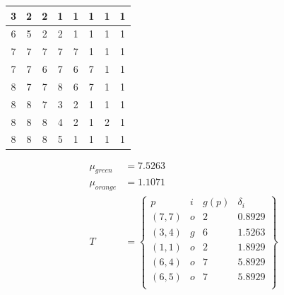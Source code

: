 \documentclass[fleqn]{article}
\begin{document}
\begin{description}
    \begin{tabular}{| c | c | c | c | c | c | c | c |}
        \hline
        \cellcolor{brown} 3 & \cellcolor{orange} 2 & \cellcolor{orange} 2 & \cellcolor{orange} 1 & \cellcolor{orange} 1 & \cellcolor{orange} 1 & \cellcolor{orange} 1 & \cellcolor{orange} 1 \\ \hline
        \cellcolor{gray} 6 & \cellcolor{gray} 5 & \cellcolor{gray} 2 & \cellcolor{gray} 2 & \cellcolor{orange} 1 & \cellcolor{orange} 1 & \cellcolor{orange} 1 & \cellcolor{orange} 1 \\ \hline
        \cellcolor{green} 7 & \cellcolor{green} 7 & \cellcolor{green} 7 & \cellcolor{gray} 7 & \cellcolor{gray} 7 & \cellcolor{orange} 1 & \cellcolor{orange} 1 & \cellcolor{orange} 1 \\ \hline
        \cellcolor{green} 7 & \cellcolor{green} 7 & \cellcolor{yellow} 6 & \cellcolor{green} 7 & \cellcolor{gray} 6 & \cellcolor{brown} 7 & \cellcolor{orange} 1 & \cellcolor{orange} 1 \\ \hline
        \cellcolor{green} 8 & \cellcolor{green} 7 & \cellcolor{green} 7 & \cellcolor{green} 8 & \cellcolor{gray} 6 & \cellcolor{brown} 7 & \cellcolor{orange} 1 & \cellcolor{orange} 1 \\ \hline
        \cellcolor{green} 8 & \cellcolor{green} 8 & \cellcolor{green} 7 & \cellcolor{gray} 3 & \cellcolor{gray} 2 & \cellcolor{orange} 1 & \cellcolor{orange} 1 & \cellcolor{orange} 1 \\ \hline
        \cellcolor{green} 8 & \cellcolor{green} 8 & \cellcolor{green} 8 & \cellcolor{gray} 4 & \cellcolor{orange} 2 & \cellcolor{orange} 1 & \cellcolor{brown} 2 & \cellcolor{orange} 1 \\ \hline
        \cellcolor{green} 8 & \cellcolor{green} 8 & \cellcolor{green} 8 & \cellcolor{gray} 5 & \cellcolor{orange} 1 & \cellcolor{orange} 1 & \cellcolor{orange} 1 & \cellcolor{orange} 1 \\ \hline
    \end{tabular}

    \begin{align*}
        \mu_{green}  &= 7.5263 \\
        \mu_{orange} &= 1.1071 \\
        T &= \begin{Bmatrix}
                p     & i & g(p) & \delta_i \\
                (7,7) & o & 2 & 0.8929 \\
                (3,4) & g & 6 & 1.5263 \\
                (1,1) & o & 2 & 1.8929 \\
                (6,4) & o & 7 & 5.8929 \\
                (6,5) & o & 7 & 5.8929 \\
            \end{Bmatrix} \\
    \end{align*}


\end{description}
\end{document}
